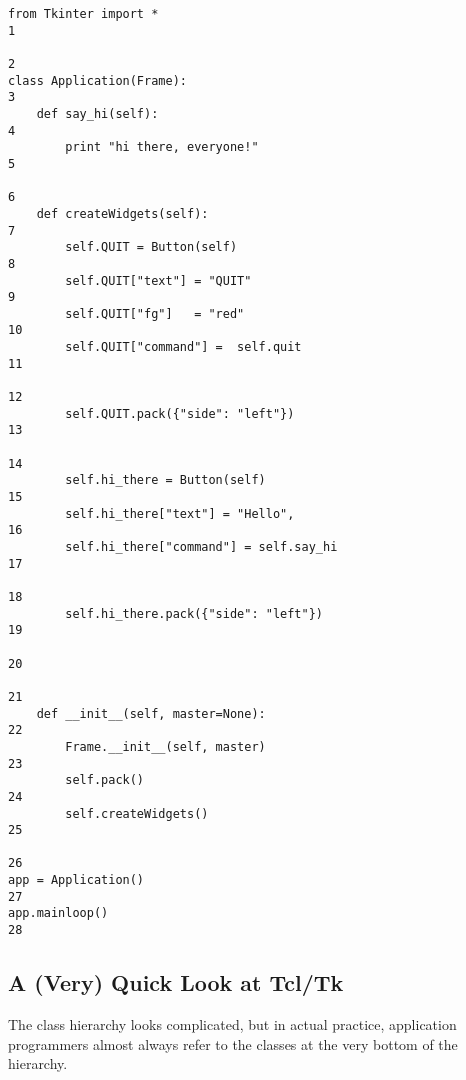 \begin{verbatim}
from Tkinter import *                                                    1
                                                                         2
class Application(Frame):                                                3
    def say_hi(self):                                                    4
        print "hi there, everyone!"                                      5
                                                                         6
    def createWidgets(self):                                             7
        self.QUIT = Button(self)                                         8
        self.QUIT["text"] = "QUIT"                                       9
        self.QUIT["fg"]   = "red"                                       10
        self.QUIT["command"] =  self.quit                               11
                                                                        12
        self.QUIT.pack({"side": "left"})                                13
                                                                        14
        self.hi_there = Button(self)                                    15
        self.hi_there["text"] = "Hello",                                16
        self.hi_there["command"] = self.say_hi                          17
                                                                        18
        self.hi_there.pack({"side": "left"})                            19
                                                                        20
                                                                        21
    def __init__(self, master=None):                                    22
        Frame.__init__(self, master)                                    23
        self.pack()                                                     24
        self.createWidgets()                                            25
                                                                        26
app = Application()                                                     27
app.mainloop()                                                          28
\end{verbatim}


\subsection{A (Very) Quick Look at Tcl/Tk} %

The class hierarchy looks complicated, but in actual practice,
application programmers almost always refer to the classes at the very
bottom of the hierarchy. 

